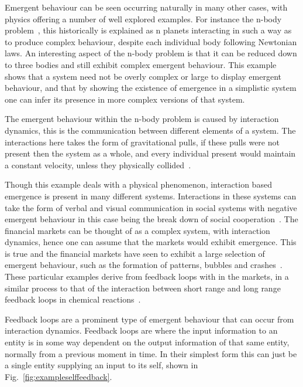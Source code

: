 \documentclass{article}
\begin{document}
Emergent behaviour can be seen occurring naturally in many other cases, with physics offering a number of well explored examples. For instance the n-body problem~\cite{nbodyproblem}, this historically is explained as n planets interacting in such a way as to produce complex behaviour, despite each individual body following Newtonian laws. An interesting aspect of the n-body problem is that it can be reduced down to three bodies and still exhibit complex emergent behaviour. This example shows that a system need not be overly complex or large to display emergent behaviour, and that by showing the existence of emergence in a simplistic system one can infer its presence in more complex versions of that system.

The emergent behaviour within the n-body problem is caused by interaction dynamics, this is the communication between different elements of a system. The interactions here takes the form of gravitational pulls, if these pulls were not present then the system as a whole, and every individual present would maintain a constant velocity, unless they physically collided~\cite{newtonconstantvelocity}.

Though this example deals with a physical phenomenon, interaction based emergence is present in many different systems. Interactions in these systems can take the form of verbal and visual communication in social systems with negative emergent behaviour in this case being the break down of social cooperation~\cite{socialemrgence}. The financial markets can be thought of as a complex system, with interaction dynamics, hence one can assume that the markets would exhibit emergence. This is true and the financial markets have seen to exhibit a large selection of emergent behaviour, such as the formation of patterns, bubbles and crashes~\cite{bubblesandcrashes}. These particular examples derive from feedback loops with in the markets, in a similar process to that of the interaction between short range and long range feedback loops in chemical reactions~\cite{turningchemical}.     

Feedback loops are a prominent type of emergent behaviour that can occur from interaction dynamics. Feedback loops are where the input information to an entity is in some way dependent on the output information of that same entity, normally from a previous moment in time. In their simplest form this can just be a single entity supplying an input to its self, shown in Fig.~\ref{fig:exampleselffeedback}.
\end{document}
